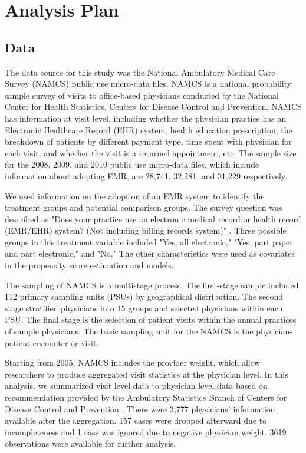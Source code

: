 \documentclass[12pt]{report}
\begin{document}
\chapter{Analysis Plan}
\section{Data}
The data source for this study was the National Ambulatory Medical Care Survey (NAMCS) public use micro-data files. NAMCS is a national probability sample survey of visits to office-based physicians conducted by the National Center for Health Statistics, Centers for Disease Control and Prevention. NAMCS has information at visit level, including whether the physician practice has an Electronic Healthcare Record (EHR) system, health education prescription, the breakdown of patients by different payment type, time spent with physician for each visit, and whether the visit is a returned appointment, etc. The sample size for the 2008, 2009, and 2010 public use micro-data files, which include information about adopting EMR, are 28,741, 32,281, and 31,229 respectively.

We used information on the adoption of an EMR system to identify the treatment groups and potential comparison groups. The survey question was described as "Does your practice use an electronic medical record or health record (EMR/EHR) system? (Not including billing records system)" \citep{NAMCSDOC2010}. Three possible groups in this treatment variable included "Yes, all electronic," "Yes, part paper and part electronic," and "No." The other characteristics were used as covariates in the propensity score estimation and models.

The sampling of NAMCS is a multistage process. The first-stage sample included 112 primary sampling units (PSUs) by geographical distribution. The second stage stratified physicians into 15 groups and selected physicians within each PSU. The final stage is the selection of patient visits within the annual practices of sample physicians. The basic sampling unit for the NAMCS is the physician-patient encounter or visit. 

Starting from 2005, NAMCS includes the provider weight, which allow researchers to produce aggregated visit statistics at the physician level. In this analysis, we summarized visit level data to physician level data based on recommendation provided by the Ambulatory Statistics Branch of Centers for Disease Control and Prevention \citep{SasProcedure}. There were 3,777 physicians' information available after the aggregation. 157 cases were dropped afterward due to incompleteness and 1 case was ignored due to negative physician weight. 3619 observations were available for further analysis. 
\end{document}
